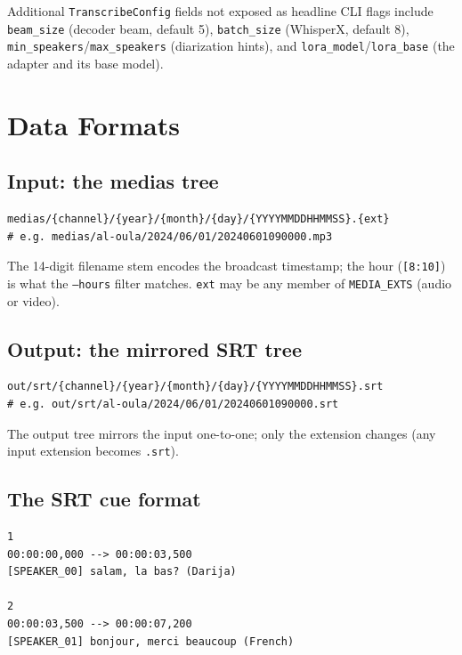 \documentclass[11pt,a4paper]{report}
\newcommand{\code}[1]{\texttt{\small #1}}
\begin{document}
\noindent
Additional \code{TranscribeConfig} fields not exposed as headline CLI flags
include \code{beam\_size} (decoder beam, default 5), \code{batch\_size} (WhisperX,
default 8), \code{min\_speakers}/\code{max\_speakers} (diarization hints), and
\code{lora\_model}/\code{lora\_base} (the adapter and its base model).

\chapter{Data Formats}
\label{ch:formats}

\section{Input: the medias tree}

\begin{lstlisting}[style=sh,numbers=none]
medias/{channel}/{year}/{month}/{day}/{YYYYMMDDHHMMSS}.{ext}
# e.g. medias/al-oula/2024/06/01/20240601090000.mp3
\end{lstlisting}

The 14-digit filename stem encodes the broadcast timestamp; the hour
(\code{[8:10]}) is what the \code{--hours} filter matches. \code{ext} may be any
member of \code{MEDIA\_EXTS} (audio or video).

\section{Output: the mirrored SRT tree}

\begin{lstlisting}[style=sh,numbers=none]
out/srt/{channel}/{year}/{month}/{day}/{YYYYMMDDHHMMSS}.srt
# e.g. out/srt/al-oula/2024/06/01/20240601090000.srt
\end{lstlisting}

The output tree mirrors the input one-to-one; only the extension changes (any
input extension becomes \code{.srt}).

\section{The SRT cue format}

\begin{lstlisting}[numbers=none,caption={Example SRT output (with diarization).}]
1
00:00:00,000 --> 00:00:03,500
[SPEAKER_00] salam, la bas? (Darija)

2
00:00:03,500 --> 00:00:07,200
[SPEAKER_01] bonjour, merci beaucoup (French)
\end{lstlisting}
\end{document}
